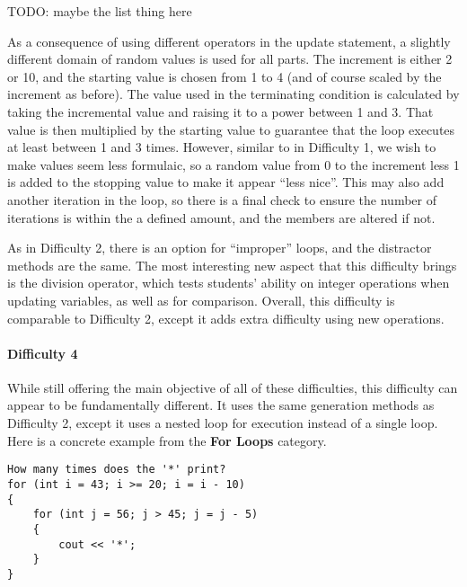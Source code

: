 \documentclass{article}
\begin{document}
TODO: maybe the list thing here 

As a consequence of using different operators in the update statement, a slightly different domain of random values is used for all parts. The increment is either 2 or 10, and the starting value 
is chosen from 1 to 4 (and of course scaled by the increment as before). The value used in the terminating condition is calculated by taking the incremental value and raising it to a power 
between 1 and 3. That value is then multiplied by the starting value to guarantee that the loop executes at least between 1 and 3 times. However, similar to in Difficulty 1, we wish to make
values seem less formulaic, so a random value from 0 to the increment less 1 is added to the stopping value to make it appear ``less nice''. This may also add another iteration in the loop,
so there is a final check to ensure the number of iterations is within the a defined amount, and the members are altered if not. 

As in Difficulty 2, there is an option for ``improper'' loops, and the distractor methods are the same. The most interesting new aspect that this difficulty brings is the division operator, which tests students' ability on integer operations
when updating variables, as well as for comparison. Overall, this difficulty is comparable to Difficulty 2, except it adds extra difficulty using new operations. 

\paragraph{Difficulty 4} \hfill \par 
While still offering the main objective of all of these difficulties, this difficulty can appear to be fundamentally different. It uses the same generation methods as Difficulty 2, except it uses 
a nested loop for execution instead of a single loop. Here is a concrete example from the \textbf{For Loops} category.

\begin{lstlisting}
How many times does the '*' print? 
for (int i = 43; i >= 20; i = i - 10) 
{ 
	for (int j = 56; j > 45; j = j - 5) 
	{ 
		cout << '*'; 
	} 
}
\end{lstlisting}
\end{document}
